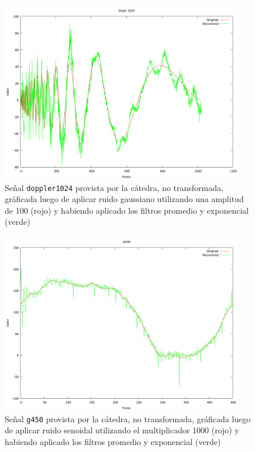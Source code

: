 \begin{figure}
\begin {center}
\includegraphics[width=299pt]{imagenes/dopp1024-gauss100-both.png}
\end {center}
\caption{Se\~nal \texttt{doppler1024} provista por la c\'atedra, no transformada, gr\'aficada
luego de aplicar ruido gaussiano utilizando una amplitud de 100 (rojo) y 
habiendo aplicado los filtros promedio y exponencial (verde)}
\label{fig:SinProm}
\end{figure}

\begin{figure}
\begin {center}
\includegraphics[width=299pt]{imagenes/g450-sin100-both.png}
\end {center}
\caption{Se\~nal \texttt{g450} provista por la c\'atedra, no transformada, gr\'aficada
luego de aplicar ruido senoidal utilizando el multiplicador 1000 (rojo) y 
habiendo aplicado los filtros promedio y exponencial (verde)}
\label{fig:SinProm}
\end{figure}

